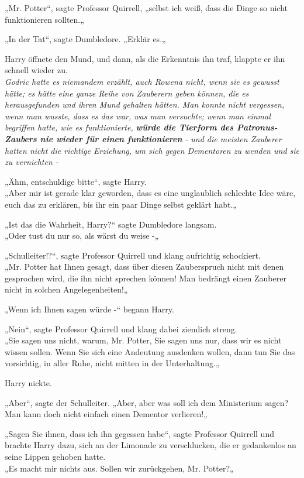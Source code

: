 {„Mr. Potter“, sagte Professor Quirrell, „selbst ich weiß, dass die Dinge so nicht funktionieren sollten.„

„In der Tat“, sagte Dumbledore. „Erklär es.„

Harry öffnete den Mund, und dann, als die Erkenntnis ihn traf, klappte er ihn schnell wieder zu.\\ \emph{Godric hatte es niemandem erzählt, auch Rowena nicht, wenn sie es gewusst hätte; es hätte eine ganze Reihe von Zauberern geben können, die es herausgefunden und ihren Mund gehalten hätten. Man konnte nicht vergessen, wenn man wusste, dass es das war, was man versuchte; wenn man einmal begriffen hatte, wie es funktionierte,} \textbf{\emph{würde die Tierform des Patronus-Zaubers nie wieder für einen funktionieren}} \emph{- und die meisten Zauberer hatten nicht die richtige Erziehung, um sich gegen Dementoren zu wenden und sie zu vernichten -}

„Ähm, entschuldige bitte“, sagte Harry.\\ „Aber mir ist gerade klar geworden, dass es eine unglaublich schlechte Idee wäre, euch das zu erklären, bis ihr ein paar Dinge selbst geklärt habt.„

„Ist das die Wahrheit, Harry?“ sagte Dumbledore langsam.\\ „Oder tust du nur so, als wärst du weise -„

„Schulleiter!?“, sagte Professor Quirrell und klang aufrichtig schockiert.\\ „Mr. Potter hat Ihnen gesagt, dass über diesen Zauberspruch nicht mit denen gesprochen wird, die ihn nicht sprechen können! Man bedrängt einen Zauberer nicht in solchen Angelegenheiten!„

„Wenn ich Ihnen sagen würde -“ begann Harry.

„Nein“, sagte Professor Quirrell und klang dabei ziemlich streng.\\ „Sie sagen uns nicht, warum, Mr. Potter, Sie sagen uns nur, dass wir es nicht wissen sollen. Wenn Sie sich eine Andeutung ausdenken wollen, dann tun Sie das vorsichtig, in aller Ruhe, nicht mitten in der Unterhaltung.„

Harry nickte.

„Aber“, sagte der Schulleiter. „Aber, aber was soll ich dem Ministerium sagen? Man kann doch nicht einfach einen Dementor verlieren!„

„Sagen Sie ihnen, dass ich ihn gegessen habe“, sagte Professor Quirrell und brachte Harry dazu, sich an der Limonade zu verschlucken, die er gedankenlos an seine Lippen gehoben hatte.\\ „Es macht mir nichts aus. Sollen wir zurückgehen, Mr. Potter?„

}
